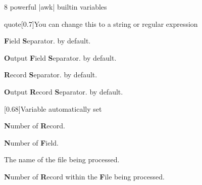 \begin{frame}{8 powerful \bash|awk| builtin variables}
    \begin{varblock}{quote}[0.7\textwidth]{You can change this to a string or regular expression}
        \normalfont
        \begin{description}[XXXXXX]
            \item[\textbf{FS}] \textbf{F}ield \textbf{S}eparator.  by default.
            \item[\textbf{OFS}] \textbf{O}utput \textbf{F}ield \textbf{S}eparator.  by default.
            \item[\textbf{RS}] \textbf{R}ecord \textbf{S}eparator.  by default.
            \item[\textbf{ORS}] \textbf{O}utput \textbf{R}ecord \textbf{S}eparator.  by default.
        \end{description}
    \end{varblock}
    \begin{varblock}{}[0.68\textwidth]{Variable automatically set}
        \begin{description}
            \item[\textbf{NR}] \textbf{N}umber of \textbf{R}ecord.
            \item[\textbf{NF}] \textbf{N}umber of \textbf{F}ield.
            \item[\textbf{FILENAME}] The name of the file being processed.
            \item[\textbf{FNR}] \textbf{N}umber of \textbf{R}ecord within the \textbf{F}ile being processed.
        \end{description}
    \end{varblock}
\end{frame}
